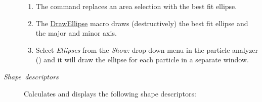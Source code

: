 \begin{description}
\begin{enumerate}
\item The 
command replaces an area selection with the best fit ellipse. 
\item The \href{http://imagej.nih.gov/ij/macros/DrawEllipse.txt}{DrawEllipse}
macro draws (destructively) the best fit ellipse and the major and
minor axis.
\item Select \emph{Ellipses} from the \emph{Show:} drop-down menu in the
particle analyzer ()
and it will draw the ellipse for each particle in a separate window.
\end{enumerate}
\item [{\emph{Shape\ descriptors}}] Calculates and displays the following
shape descriptors:


\end{description}
